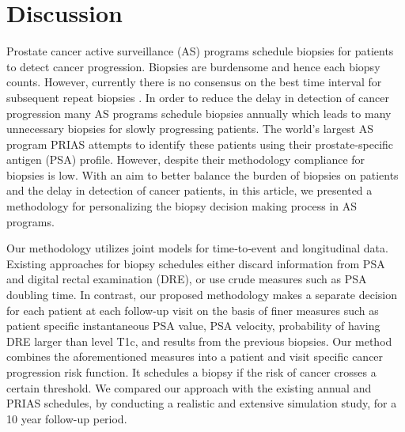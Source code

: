 
\section{Discussion}
\label{sec:discussion}
Prostate cancer active surveillance (AS) programs schedule biopsies for patients to detect cancer progression. Biopsies are burdensome and hence each biopsy counts. However, currently there is no consensus on the best time interval for subsequent repeat biopsies \cite{loeb2014heterogeneity}. In order to reduce the delay in detection of cancer progression many AS programs schedule biopsies annually which leads to many unnecessary biopsies for slowly progressing patients. The world's largest AS program PRIAS attempts to identify these patients using their prostate-specific antigen (PSA) profile. However, despite their methodology compliance for biopsies is low. With an aim to better balance the burden of biopsies on patients and the delay in detection of cancer patients, in this article, we presented a methodology for personalizing the biopsy decision making process in AS programs. 

Our methodology utilizes joint models for time‐to‐event and longitudinal data. Existing approaches for biopsy schedules either discard information from PSA and digital rectal examination (DRE), or use crude measures such as PSA doubling time. In contrast, our proposed methodology makes a separate decision for each patient at each follow-up visit on the basis of finer measures such as patient specific instantaneous PSA value, PSA velocity, probability of having DRE larger than level T1c, and results from the previous biopsies. Our method combines the aforementioned measures into a patient and visit specific cancer progression risk function. It schedules a biopsy if the risk of cancer crosses a certain threshold. We compared our approach with the existing annual and PRIAS schedules, by conducting a realistic and extensive simulation study, for a 10 year follow-up period.

